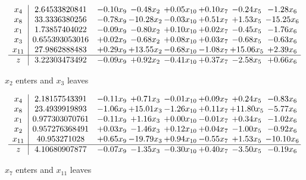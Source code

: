 \documentclass[8pt]{article}
\begin{document}
 \[\begin{array}{c| c c@{\hskip 2pt} c@{\hskip 2pt} c@{\hskip 2pt} c@{\hskip 2pt} c@{\hskip 2pt} c@{\hskip 2pt} }
 x_{4}   &  2.64533820841 & -0.10 x_{9} & -0.48 x_{2} & +  0.05 x_{10} & +  0.10 x_{7} & -0.24 x_{5} & -1.28 x_{6}\\
 x_{8}   &  33.3336380256 & -0.78 x_{9} & -10.28 x_{2} & -0.03 x_{10} & +  0.51 x_{7} & +  1.53 x_{5} & -15.25 x_{6}\\
 x_{1}   &  1.73857404022 & -0.09 x_{9} & -0.80 x_{2} & +  0.10 x_{10} & +  0.02 x_{7} & -0.45 x_{5} & -1.76 x_{6}\\
 x_{3}   &  0.655393053016 & +  0.02 x_{9} & -0.68 x_{2} & +  0.08 x_{10} & +  0.03 x_{7} & -0.68 x_{5} & -0.63 x_{6}\\
 x_{11}   &  27.9862888483 & +  0.29 x_{9} & + 13.55 x_{2} & -0.68 x_{10} & -1.08 x_{7} & + 15.06 x_{5} & +  2.39 x_{6}\\
\hline
z    &  3.22303473492 & -0.09 x_{9} & +  0.92 x_{2} & -0.41 x_{10} & +  0.37 x_{7} & -2.58 x_{5} & +  0.66 x_{6}\\
\end{array}\]


 $ x_{2} $ enters and $ x_{3} $ leaves 

 \[\begin{array}{c| c c@{\hskip 2pt} c@{\hskip 2pt} c@{\hskip 2pt} c@{\hskip 2pt} c@{\hskip 2pt} c@{\hskip 2pt} }
 x_{4}   &  2.18157543391 & -0.11 x_{9} & +  0.71 x_{3} & -0.01 x_{10} & +  0.09 x_{7} & +  0.24 x_{5} & -0.83 x_{6}\\
 x_{8}   &  23.4939919893 & -1.06 x_{9} & + 15.01 x_{3} & -1.26 x_{10} & +  0.11 x_{7} & + 11.80 x_{5} & -5.77 x_{6}\\
 x_{1}   &  0.977303070761 & -0.11 x_{9} & +  1.16 x_{3} & +  0.00 x_{10} & -0.01 x_{7} & +  0.34 x_{5} & -1.02 x_{6}\\
 x_{2}   &  0.957276368491 & +  0.03 x_{9} & -1.46 x_{3} & +  0.12 x_{10} & +  0.04 x_{7} & -1.00 x_{5} & -0.92 x_{6}\\
 x_{11}   &  40.953271028 & +  0.65 x_{9} & -19.79 x_{3} & +  0.94 x_{10} & -0.55 x_{7} & +  1.53 x_{5} & -10.10 x_{6}\\
\hline
z    &  4.10680907877 & -0.07 x_{9} & -1.35 x_{3} & -0.30 x_{10} & +  0.40 x_{7} & -3.50 x_{5} & -0.19 x_{6}\\
\end{array}\]


 $ x_{7} $ enters and $ x_{11} $ leaves 
\end{document}

